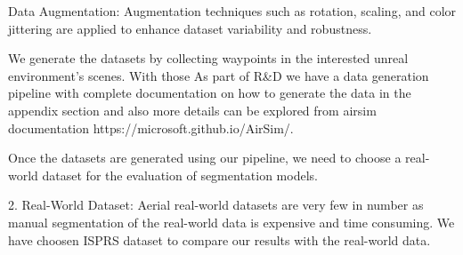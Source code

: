 \documentclass[../report.tex]{subfiles}
\begin{document}
    Data Augmentation:
    Augmentation techniques such as rotation, scaling, and color jittering are applied to enhance dataset variability and robustness.
    
    We generate the datasets by collecting waypoints in the interested unreal environment's scenes. With those 
    As part of R\&D we have a data generation pipeline with complete documentation on how to generate the data in the appendix section and also more details can be explored from airsim documentation https://microsoft.github.io/AirSim/. 

    Once the datasets are generated using our pipeline, we need to choose a real-world dataset for the evaluation of segmentation models. 
    
    2. Real-World Dataset: 
    Aerial real-world datasets are very few in number as manual segmentation of the real-world data is expensive and time consuming. We have choosen ISPRS dataset to compare our results with the real-world data. 

    

\end{document}

